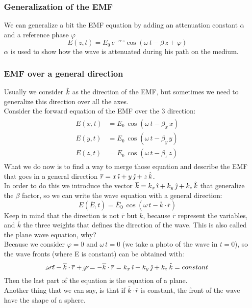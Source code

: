 \subsubsection*{Generalization of the EMF}
We can generalize a bit the EMF equation by adding an attenuation constant $\alpha$ and a reference phase $\varphi$
\begin{equation}\label{eq:wave_equation_generalized}
    E(z,t)=E_0\,e^{-\alpha\,z}\cos(\omega\,t-\beta\,z+\varphi)
\end{equation}
$\alpha$ is used to show how the wave is attenuated during his path on the medium.
\subsubsection*{EMF over a general direction}
Usually we consider $\hat{\mathnormal{k}}$ as the direction of the EMF, but sometimes we need to generalize this direction over all the axes.\\
Consider the forward equation of the EMF over the 3 direction:
\begin{align}\label{eq:electric_field_3_axes}
    \begin{split}
        E(x,t)&=E_0\,\cos(\omega\,t-\beta_x\,x)\\[5pt]
        E(y,t)&=E_0\,\cos(\omega\,t-\beta_y\,y)\\[5pt]
        E(z,t)&=E_0\,\cos(\omega\,t-\beta_z\,z)
    \end{split}
\end{align}
What we do now is to find a way to merge those equation and describe the EMF that goes in a general direction $\overline{r}=x\,\hat{\imath}+y\,\hat{\jmath}+z\,\hat{\mathnormal{k}}$.\\
In order to do this we introduce the vector $\overline{k}=k_x\,\hat{\imath}+k_y\,\hat{\jmath}+k_z\,\hat{\mathnormal{k}}$ that generalize the $\beta$ factor, so we can write the wave equation with a general direction:
\begin{equation}
    E(\overline{E},t)=\overline{E}_0\,\cos(\omega\,t-\overline{k}\cdot\overline{r})
\end{equation}
Keep in mind that the direction is not $\overline{r}$ but $\overline{k}$, because $\overline{r}$ represent the variables, and $\overline{k}$ the three weights that defines the direction of the wave.
This is also called the plane wave equation, why?\\
Because we consider $\varphi = 0$ and $\omega\,t=0$ (we take a photo of the wave in $t=0$), so the wave fronts (where E is constant) can be obtained with:
\begin{equation}
    \cancel{\omega\,t}-\overline{k}\cdot\overline{r}+\cancel{\varphi}=-\overline{k}\cdot\overline{r}=k_x\,\hat{\imath}+k_y\,\hat{\jmath}+k_z\,\hat{\mathnormal{k}}=constant
\end{equation}
Then the last part of the equation is the equation of a plane.\\
Another thing that we can say, is that if $\overline{k}\cdot\overline{r}$ is constant, the front of the wave have the shape of a sphere.